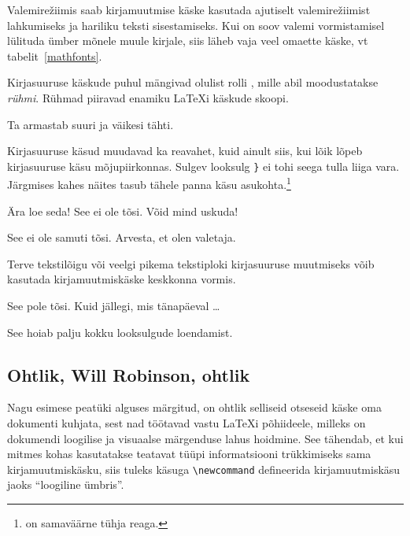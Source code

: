 Valemire\v{z}iimis saab kirjamuutmise käske kasutada ajutiselt
valemire\v{z}iimist lahkumiseks ja hariliku teksti sisestamiseks. Kui on
soov valemi vormistamisel lülituda ümber mõnele muule kirjale, siis
läheb vaja veel omaette käske, vt tabelit~\ref{mathfonts}.


Kirjasuuruse käskude puhul mängivad olulist rolli , mille
abil moodustatakse \emph{rühmi}. Rühmad piiravad enamiku
\LaTeX i käskude skoopi.

\begin{example}
Ta armastab {\LARGE suuri
ja {\small väikesi} tähti}.
\end{example}

Kirjasuuruse käsud muudavad ka reavahet, kuid ainult siis, kui lõik
lõpeb kirjasuuruse käsu mõjupiirkonnas. Sulgev looksulg \verb|}| ei tohi
seega tulla liiga vara. Järgmises kahes näites tasub tähele panna käsu
 asukohta.\footnote{ on samaväärne tühja reaga.}

\begin{example}
{\Large Ära loe seda!
 See ei ole tõsi.
 Võid mind uskuda!\par}
\end{example}

\begin{example}
{\Large See ei ole samuti tõsi.
Arvesta, et olen valetaja.}\par
\end{example}

Terve tekstilõigu või veelgi pikema tekstiploki kirjasuuruse muutmiseks
võib kasutada kirjamuutmiskäske keskkonna vormis.

\begin{example}
\begin{Large}
See pole tõsi.
Kuid jällegi, mis tänapäeval
\ldots
\end{Large}
\end{example}

\noindent See hoiab palju kokku looksulgude loendamist.

\subsection{Ohtlik, Will Robinson, ohtlik}

Nagu esimese peatüki alguses märgitud, on ohtlik selliseid otseseid
käske oma dokumenti kuhjata, sest nad töötavad vastu \LaTeX i
põhiideele, milleks on dokumendi loogilise ja visuaalse märgenduse lahus
hoidmine. See tähendab, et kui mitmes kohas kasutatakse teatavat tüüpi
informatsiooni trükkimiseks sama kirjamuutmiskäsku, siis tuleks käsuga
\verb|\newcommand| defineerida kirjamuutmiskäsu jaoks "`loogiline
ümbris"'.

